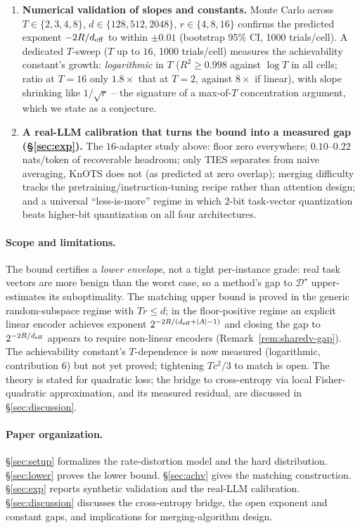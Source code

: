 \begin{enumerate}[leftmargin=*,topsep=2pt,itemsep=2pt]
\item \textbf{Numerical validation of slopes and constants.} Monte
Carlo across $T \in \{2,3,4,8\}$, $d \in \{128, 512, 2048\}$,
$r \in \{4, 8, 16\}$ confirms the predicted exponent $-2R/d_{\mathrm{eff}}$ to
within $\pm 0.01$ (bootstrap $95\%$ CI, 1000 trials/cell). A dedicated
$T$-sweep ($T$ up to $16$, 1000 trials/cell) measures the
achievability constant's growth: \emph{logarithmic} in $T$
($R^2 \geq 0.998$ against $\log T$ in all cells; ratio at $T{=}16$
only $1.8\times$ that at $T{=}2$, against $8\times$ if linear), with
slope shrinking like $1/\sqrt{r}$ -- the signature of a max-of-$T$
concentration argument, which we state as a conjecture.

\item \textbf{A real-LLM calibration that turns the bound into a
measured gap (\S\ref{sec:exp}).} The $16$-adapter study above: floor
zero everywhere; $0.10$--$0.22$ nats/token of recoverable headroom;
only TIES separates from naive averaging, KnOTS does not (as
predicted at zero overlap); merging difficulty tracks the
pretraining/instruction-tuning recipe rather than attention design;
and a universal ``less-is-more'' regime in which $2$-bit task-vector
quantization beats higher-bit quantization on all four architectures.
\end{enumerate}

\paragraph{Scope and limitations.} The bound certifies a \emph{lower
envelope}, not a tight per-instance grade: real task vectors are more
benign than the worst case, so a method's gap to $\mathcal{D}^\star$
upper-estimates its suboptimality. The matching upper bound is proved
in the generic random-subspace regime with $Tr \leq d$; in the
floor-positive regime an explicit linear encoder achieves exponent
$2^{-2R/(d_{\mathrm{eff}} + |A| - 1)}$ and closing the gap to $2^{-2R/d_{\mathrm{eff}}}$
appears to require non-linear encoders
(Remark~\ref{rem:sharedv-gap}). The achievability constant's
$T$-dependence is now measured (logarithmic, contribution 6) but not
yet proved; tightening $Tc^2/3$ to match is open. The theory is
stated for quadratic loss; the bridge to cross-entropy via local
Fisher-quadratic approximation, and its measured residual, are
discussed in \S\ref{sec:discussion}.

\paragraph{Paper organization.} \S\ref{sec:setup} formalizes the
rate-distortion model and the hard distribution. \S\ref{sec:lower}
proves the lower bound. \S\ref{sec:achv} gives the matching
construction. \S\ref{sec:exp} reports synthetic validation and the
real-LLM calibration. \S\ref{sec:discussion} discusses the
cross-entropy bridge, the open exponent and constant gaps, and
implications for merging-algorithm design.
